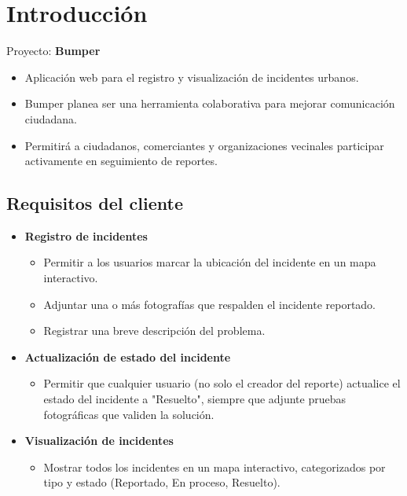 \section{Introducción}

Proyecto: \textbf{Bumper}

\begin{itemize}
    \item Aplicación web para el registro y visualización de incidentes urbanos.

    \item Bumper planea ser una herramienta colaborativa para mejorar comunicación ciudadana.

    \item Permitirá a ciudadanos, comerciantes y organizaciones vecinales participar activamente en seguimiento de reportes.
\end{itemize}

\subsection*{Requisitos del cliente}

\begin{itemize}
    \item \textbf{Registro de incidentes}
    \begin{itemize}
        \item Permitir a los usuarios marcar la ubicación del incidente en un mapa interactivo.
        \item Adjuntar una o más fotografías que respalden el incidente reportado.
        \item Registrar una breve descripción del problema.
    \end{itemize}
    \item \textbf{Actualización de estado del incidente}
    \begin{itemize}
        \item Permitir que cualquier usuario (no solo el creador del reporte) actualice el estado del incidente a "Resuelto", siempre que adjunte pruebas fotográficas que validen la solución.
    \end{itemize}
    \item \textbf{Visualización de incidentes}
    \begin{itemize}
        \item Mostrar todos los incidentes en un mapa interactivo, categorizados por tipo y estado (Reportado, En proceso, Resuelto).
    \end{itemize}
\end{itemize}
